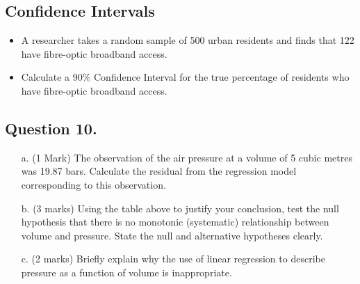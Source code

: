 \documentclass[]{report}
\begin{document}
\subsection*{Confidence Intervals}


\begin{itemize}
	\item A researcher takes a random sample of 500 urban residents and finds that
	122 have fibre-optic broadband access. 
	\item Calculate a 90\% Confidence Interval for
	the true percentage of residents who have fibre-optic broadband access.
\end{itemize}	
\subsection*{Question 10. } %

\begin{itemize}
	\item[a.] (1 Mark) The observation of the air pressure at a volume of 5 cubic metres was 19.87 bars.
	Calculate the residual from the regression model corresponding to this observation.
	\item[b.] (3 marks) Using the table above to justify your conclusion, test the null hypothesis that there
	is no monotonic (systematic) relationship between volume and pressure. State the null
	and alternative hypotheses clearly.
	\item[c.] (2 marks) Briefly explain why the use of linear regression to describe pressure as a function
	of volume is inappropriate.
\end{itemize}







\end{document}
